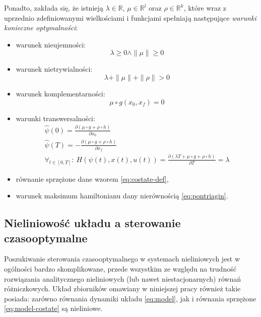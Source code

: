 Ponadto, zakłada się, że istnieją $\lambda \in \mathbb{R}$, $\mu \in \mathbb{R}^{l}$ oraz $\rho \in \mathbb{R}^{k}$, które wraz z uprzednio zdefiniowanymi wielkościami i funkcjami spełniają następujące \emph{warunki konieczne optymalności}:
\begin{itemize}
    \item warunek nieujemności:
    \begin{equation}\label{eq:pontryagin-noneg}
    \lambda \geq 0 \land \|\mu\| \geq 0
    \end{equation}
    \item warunek nietrywialności:
    \begin{equation}\label{eq:pontryagin-notriv}
    \lambda + \|\mu\| + \|\rho\| > 0
    \end{equation}
    \item warunek komplementarności:
    \begin{equation}\label{eq:pontryagin-comp}
    \mu \circ g(x_{0}, x_{f}) = 0
    \end{equation}
    \item warunki transwersalności:
    \begin{equation}\label{eq:pontryagin-trans}
    \begin{array}{lr}
        \hat{\psi}(0) = \frac{\partial (\mu \circ g + \rho \circ h)}{\partial x_{0}}\\[8pt]
        \hat{\psi}(T) = - \frac{\partial (\mu \circ g + \rho \circ h)}{\partial x_{f}}\\[8pt]
        \forall_{t \in [0, T]}:~ H(\psi(t), x(t), u(t)) = \frac{\partial (\lambda T + \mu \circ g + \rho \circ h)}{\partial T} = \lambda
    \end{array}
    \end{equation}
    \item równanie sprzężone dane wzorem \ref{eq:costate-def},
    \item warunek maksimum hamiltonianu dany nierównością \ref{eq:pontriagin}.
\end{itemize}


\subsection{Nieliniowość układu a sterowanie czasooptymalne}
\label{sub:toc-nonlnr}

Poszukiwanie sterowania czasooptymalnego w systemach nieliniowych jest w ogólności bardzo skomplikowane, przede wszystkim ze względu na trudność rozwiązania analitycznego nieliniowych (lub nawet niestacjonarnych) równań różniczkowych. Układ zbiorników omawiany w niniejszej pracy również takie posiada: zarówno równania dynamiki układu \ref{eq:model}, jak i równania sprzężone \ref{eq:model-costate} są nieliniowe.

